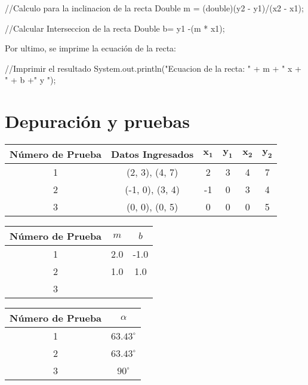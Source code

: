 \documentclass{IEEEcsmag}
\begin{document}
\begin{javaCode}
    //Calculo para la inclinacion de la recta  
    Double m = (double)(y2 - y1)/(x2 - x1);
       
    //Calcular Interseccion de la recta
    Double b= y1 -(m * x1);
\end{javaCode}

Por ultimo, se imprime la ecuación de la recta:
\begin{javaCode}
    //Imprimir el resultado 
        System.out.println("Ecuacion de la recta: \n" +
                            m + " x + " + b +" y ");
\end{javaCode}

\section{Depuración y pruebas}
\begin{tabular}{|c|c|c|c|c|c|}
    \hline
    \textbf{Número de Prueba} & \textbf{Datos Ingresados} & \textbf{\(\boldsymbol{x_1}\)} & \textbf{\(\boldsymbol{y_1}\)} & \textbf{\(\boldsymbol{x_2}\)} & \textbf{\(\boldsymbol{y_2}\)} \\
    \hline
    1 & (2, 3), (4, 7) & 2 & 3 & 4 & 7 \\
    \hline
    2 & (-1, 0), (3, 4) & -1 & 0 & 3 & 4 \\
    \hline
    3 & (0, 0), (0, 5) & 0 & 0 & 0 & 5 \\
    \hline
    \end{tabular}
    
    \vspace{0.5cm}
    
    \begin{tabular}{|c|c|c|}
    \hline
    \textbf{Número de Prueba} & \textbf{\(m\)} & \textbf{\(b\)} \\
    \hline
    1 & 2.0 & -1.0 \\
    \hline
    2 & 1.0 & 1.0 \\
    \hline
    3 & \text{--} & \text{--} \\
    \hline
    \end{tabular}
    
    \vspace{0.5cm}
    
    \begin{tabular}{|c|c|}
    \hline
    \textbf{Número de Prueba} & \textbf{\(\alpha\)} \\
    \hline
    1 & \(63.43^\circ\) \\
    \hline
    2 & \(63.43^\circ\) \\
    \hline
    3 & \(90^\circ\) \\
    \hline
    \end{tabular}
\end{document}
